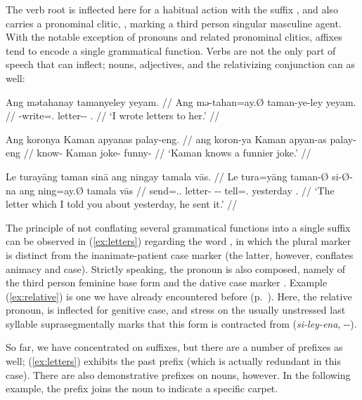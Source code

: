 The verb root  is inflected here for a habitual action
with the suffix , and also carries a pronominal
clitic, , marking a third person singular
masculine agent. With the notable exception of pronouns and related pronominal
clitics, affixes tend to encode a single grammatical function. Verbs are not
the only part of speech that can inflect; nouns, adjectives, and the
relativizing conjunction can as well:

\pex
\a\label{ex:letters}\begingl
	\gla Ang mətahanay tamanyeley yeyam. //
	\glb Ang mə-tahan=ay.Ø taman-ye-ley yeyam. //
	\glc \AgtT{} \Pst{}-write=\Fsg{}.\Top{} letter-\Pl{}-\PargI{} 
		\TsgF{}.\Dat{} //
	\glft `I wrote letters to her.' //
\endgl

\a\label{ex:adjinfl}\begingl
	\gla Ang koronya Kaman apyanas palay-eng. //
	\glb ang koron-ya Kaman apyan-as palay-eng //
	\glc \AgtT{} know-\TsgM{} Kaman joke-\Parg{} funny-\Comp{} //
	\glft `Kaman knows a funnier joke.' //
\endgl

\a\label{ex:relative}\begingl
	\gla Le turayāng taman sinā ang ningay tamala vās. //
	\glb Le tura=yāng taman-Ø si-Ø-na ang ning=ay.Ø tamala vās //
	\glc \PatTI{} send=\Tsg{}.\M{}.\Aarg{} letter-\Top{} 
		\Rel{}-\PatTI{}-\Gen{} \AgtT{} tell=\Fsg{}.\Top{} yesterday 
		\Ssg{}.\Parg{} //
	\glft `The letter which I told you about yesterday, he sent it.' //
\endgl
\xe

The principle of not conflating several grammatical functions into a single
suffix can be observed in (\ref{ex:letters}) regarding the word
, in which the plural marker 
 is distinct from the inanimate-patient case marker 
 (the latter, however, conflates animacy and case). Strictly 
speaking, the pronoun  is also composed, namely of
the third person feminine base form  and the dative case marker
. Example (\ref{ex:relative}) is one we have already 
encountered before (p.~\pageref{doublerel}). Here, the relative pronoun,
 is inflected for genitive case, and 
stress on the usually unstressed last syllable
suprasegmentally marks that this form is contracted from
 (\textit{si-ley-ena}, \Rel{}-\PargI{}-\Gen{}).

So far, we have concentrated on suffixes, but there are a number of 
prefixes as well; (\ref{ex:letters}) exhibits the past prefix 
 (which is actually redundant in this case). There are also 
demonstrative prefixes on nouns, however. In the following example, the prefix 
 joins the noun  to indicate 
a specific carpet.

